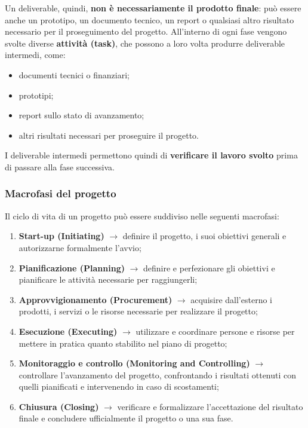 \noindent Un deliverable, quindi, \textbf{non è necessariamente il prodotto finale}: può essere anche un prototipo, 
un documento tecnico, un report o qualsiasi altro risultato necessario per il proseguimento del progetto.
\noindent All'interno di ogni fase vengono svolte diverse \textbf{attività (task)}, che possono a loro volta produrre 
deliverable intermedi, come:
\begin{itemize}
    \item documenti tecnici o finanziari;
    \item prototipi;
    \item report sullo stato di avanzamento;
    \item altri risultati necessari per proseguire il progetto.
\end{itemize}

\noindent I deliverable intermedi permettono quindi di \textbf{verificare il lavoro svolto} prima di passare alla fase successiva.

\subsubsection*{Macrofasi del progetto}
Il ciclo di vita di un progetto può essere suddiviso nelle seguenti macrofasi:

\begin{enumerate}
    \item \textbf{Start-up (Initiating)} $\rightarrow$ definire il progetto, i suoi obiettivi generali 
    e autorizzarne formalmente l'avvio;

    \item \textbf{Pianificazione (Planning)} $\rightarrow$ definire e perfezionare gli obiettivi e pianificare le 
    attività necessarie per raggiungerli;

    \item \textbf{Approvvigionamento (Procurement)} $\rightarrow$ acquisire 
    dall'esterno i prodotti, i servizi o le risorse necessarie per realizzare il progetto;

    \item \textbf{Esecuzione (Executing)} $\rightarrow$ utilizzare e coordinare persone e risorse per 
    mettere in pratica quanto stabilito nel piano di progetto;

    \item \textbf{Monitoraggio e controllo (Monitoring and Controlling)} $\rightarrow$ controllare l'avanzamento del 
    progetto, confrontando i risultati ottenuti con quelli pianificati e intervenendo in caso di scostamenti;

    \item \textbf{Chiusura (Closing)} $\rightarrow$ verificare e formalizzare l'accettazione del risultato finale e 
    concludere ufficialmente il progetto o una sua fase.
\end{enumerate}

